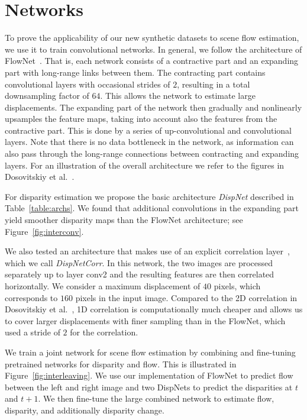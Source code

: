 \documentclass[10pt,twocolumn,letterpaper]{article}
\begin{document}
\section{Networks}\label{sec:nets}
To prove the applicability of our new synthetic datasets to scene flow estimation, we use it to train convolutional networks. In general, we follow the architecture of FlowNet~\cite{FlowNet}.
That is, each network consists of a contractive part and an expanding part with long-range links between them.
The contracting part contains convolutional layers with occasional strides of $2$, resulting in a total downsampling factor of $64$.
This allows the network to estimate large displacements.
The expanding part of the network then gradually and nonlinearly upsamples the feature maps, taking into account also the features from the contractive part.
This is done by a series of up-convolutional and convolutional layers. Note that there is no data bottleneck in the network, as information can also pass through the long-range connections between contracting and expanding layers.
For an illustration of the overall architecture we refer to the figures in Dosovitskiy et al.~\cite{FlowNet}.

For disparity estimation we propose the basic architecture \emph{DispNet} described in Table~\ref{table:archs}. We found that additional convolutions in the expanding part yield smoother disparity maps than the FlowNet architecture; see Figure~\ref{fig:interconv}.

We also tested an architecture that makes use of an explicit correlation layer~\cite{FlowNet}, which we call \emph{DispNetCorr}.
In this network, the two images are processed separately up to layer conv2 and the resulting features are then correlated horizontally. We consider a maximum displacement of $40$ pixels, which corresponds to $160$ pixels in the input image. 
Compared to the 2D correlation in Dosovitskiy et al.~\cite{FlowNet}, 1D correlation is computationally much cheaper and allows us to cover larger displacements with finer sampling than in the FlowNet, which used a stride of $2$ for the correlation. 

We train a joint network for scene flow estimation by combining and fine-tuning pretrained networks for disparity and flow.
This is illustrated in Figure~\ref{fig:interleaving}. We use our implementation of FlowNet to predict flow between the left and right image and two DispNets to predict the disparities at $t$ and $t\!+\!1$. We then fine-tune the large combined network to estimate flow, disparity, and additionally disparity change. 
\end{document}
